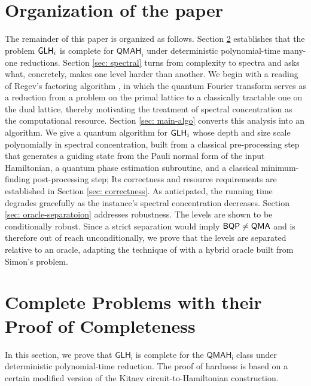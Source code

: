 \documentclass[11pt]{article}
\newcommand{\ms}[1]{\mathsf{#1}}
\begin{document}
\section{Organization of the paper}
The remainder of this paper is organized as follows. Section \ref{sec: complete-problems} establishes that the problem $\mathsf{GLH}_i$ is complete for $\ms{QMAH}_i$ under deterministic polynomial-time many-one reductions. Section \ref{sec: spectral} turns from complexity to spectra and asks what, concretely, makes one level harder than another. We begin with a reading of Regev's factoring algorithm \cite{regev2025efficient}, in which the quantum Fourier transform serves as a reduction from a problem on the primal lattice to a classically tractable one on the dual lattice, thereby motivating the treatment of spectral concentration as the computational resource. Section \ref{sec: main-algo} converts this analysis into an algorithm. We give a quantum algorithm for $\mathsf{GLH}_i$ whose depth and size scale polynomially in spectral concentration, built from a classical pre-processing step that generates a guiding state from the Pauli normal form of the input Hamiltonian, a quantum phase estimation subroutine, and a classical minimum-finding post-processing step; Its correctness and resource requirements are established in Section \ref{sec: correctness}. As anticipated, the running time degrades gracefully as the instance's spectral concentration decreases. Section \ref{sec: oracle-separatoion} addresses robustness. The levels are shown to be conditionally robust. Since a strict separation would imply $\mathsf{BQP} \neq \mathsf{QMA}$ and is therefore out of reach unconditionally, we prove that the levels are separated relative to an oracle, adapting the technique of \cite{Kintala1980-yv} with a hybrid oracle built from Simon's problem.


\section{Complete Problems with their Proof of Completeness}\label{sec: complete-problems}
In this section, we prove that $\ms{GLH_i}$ is complete for the $\ms{QMAH_i}$ class under deterministic polynomial-time reduction. The proof of hardness is based on a certain modified version of the Kitaev circuit-to-Hamiltonian construction. 

\end{document}
